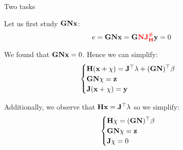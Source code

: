 \documentclass{beamer}
\newcommand{\JH} {\bo{J}^\#_\bo{H}}
\begin{document}
\begin{frame}{Two tasks}
	\begin{flushleft}
		
		Let us first study $\mathbf{G}\mathbf{N}\mathbf{x}$:
		\begin{align}
			e = \bo{G}\bo{N}\bo{x} 
			 = \bo{G} \textcolor{red}{\bo{N}\JH} \bo{y}=0
		\end{align}
		
		We found that $\mathbf{G}\mathbf{N}\mathbf{x} = 0$. Hence we can simplify:
		\begin{equation}
			\begin{cases}
				\mathbf{H} (\mathbf{x} + \chi) = \mathbf{J}^\top \lambda + (\mathbf{G}\mathbf{N})^\top \beta\\
				\mathbf{G}\mathbf{N} \chi = \mathbf{z} \\
				\mathbf{J} (\mathbf{x} + \chi) = \mathbf{y}
			\end{cases}
		\end{equation}
		
		Additionally, we observe that $\mathbf{H} \mathbf{x} = \mathbf{J}^\top \lambda$ so we simplify:
		\begin{equation}
			\begin{cases}
				\mathbf{H} \chi = (\mathbf{G}\mathbf{N})^\top \beta\\
				\mathbf{G}\mathbf{N} \chi = \mathbf{z} \\
				\mathbf{J} \chi = 0
			\end{cases}
		\end{equation}
		
	\end{flushleft}
\end{frame}
\end{document}
